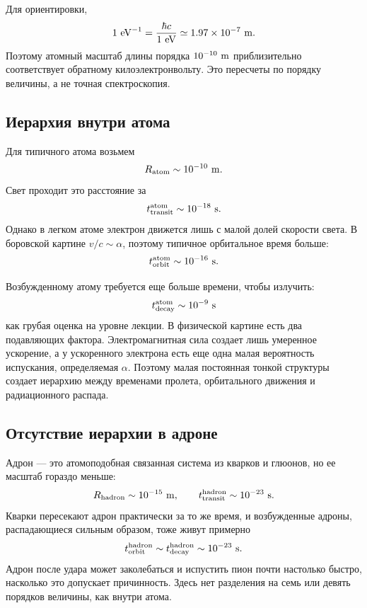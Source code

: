 Для ориентировки,
\begin{equation}
1\ {\rm eV}^{-1}
=\frac{\hbar c}{1\ {\rm eV}}
\simeq 1.97\times10^{-7}\ {\rm m}.
\end{equation}
Поэтому атомный масштаб длины порядка \(10^{-10}\ {\rm m}\) приблизительно соответствует обратному килоэлектронвольту. Это пересчеты по порядку величины, а не точная спектроскопия.

\subsection{Иерархия внутри атома}

Для типичного атома возьмем
\begin{equation}
R_{\rm atom}\sim10^{-10}\ {\rm m}.
\end{equation}
Свет проходит это расстояние за
\begin{equation}
t_{\rm transit}^{\rm atom}\sim10^{-18}\ {\rm s}.
\end{equation}
Однако в легком атоме электрон движется лишь с малой долей скорости света. В боровской картине \(v/c\sim\alpha\), поэтому типичное орбитальное время больше:
\begin{equation}
t_{\rm orbit}^{\rm atom}\sim10^{-16}\ {\rm s}.
\end{equation}

Возбужденному атому требуется еще больше времени, чтобы излучить:
\begin{equation}
t_{\rm decay}^{\rm atom}\sim10^{-9}\ {\rm s}
\end{equation}
как грубая оценка на уровне лекции. В физической картине есть два подавляющих фактора. Электромагнитная сила создает лишь умеренное ускорение, а у ускоренного электрона есть еще одна малая вероятность испускания, определяемая \(\alpha\). Поэтому малая постоянная тонкой структуры создает иерархию между временами пролета, орбитального движения и радиационного распада.

\subsection{Отсутствие иерархии в адроне}

Адрон — это атомоподобная связанная система из кварков и глюонов, но ее масштаб гораздо меньше:
\begin{equation}
R_{\rm hadron}\sim10^{-15}\ {\rm m},
\qquad
t_{\rm transit}^{\rm hadron}\sim10^{-23}\ {\rm s}.
\end{equation}
Кварки пересекают адрон практически за то же время, и возбужденные адроны, распадающиеся сильным образом, тоже живут примерно
\begin{equation}
t_{\rm orbit}^{\rm hadron}
\sim t_{\rm decay}^{\rm hadron}
\sim10^{-23}\ {\rm s}.
\end{equation}
Адрон после удара может заколебаться и испустить пион почти настолько быстро, насколько это допускает причинность. Здесь нет разделения на семь или девять порядков величины, как внутри атома.

